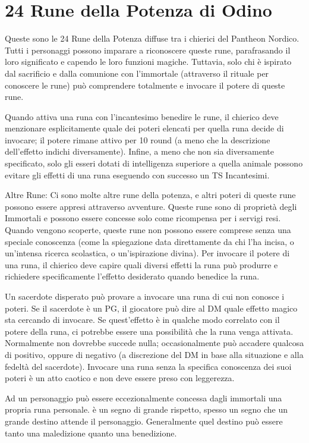 \documentclass[10pt,a4paper]{article}
\begin{document}
\section*{24 Rune della Potenza di Odino}
 
Queste sono le 24 Rune della Potenza diffuse tra i chierici del Pantheon Nordico. Tutti i personaggi possono imparare a riconoscere 
queste rune, parafrasando il loro significato e capendo le loro funzioni magiche. Tuttavia, solo chi \`{e} ispirato dal sacrificio e 
dalla comunione con l'immortale (attraverso il rituale per conoscere le rune) pu\`{o} comprendere totalmente e invocare il potere di queste 
rune.
 
Quando attiva una runa con l'incantesimo benedire le rune, il chierico deve menzionare esplicitamente quale dei poteri elencati per quella runa decide di invocare; il potere rimane attivo per 10 round (a meno che la descrizione dell'effetto indichi diversamente). Infine, a meno che non sia diversamente specificato, solo gli esseri dotati di intelligenza superiore a quella animale possono evitare gli effetti di una runa eseguendo con successo un TS Incantesimi.
 
Altre Rune: Ci sono molte altre rune della potenza, e altri poteri di queste rune possono essere appresi attraverso avventure. Queste 
rune sono di propriet\`{a} degli Immortali e possono essere concesse solo come ricompensa per i servigi resi. Quando vengono scoperte, 
queste rune non possono essere comprese senza una speciale conoscenza (come la spiegazione data direttamente da chi l'ha incisa, o 
un'intensa ricerca scolastica, o un'ispirazione divina). Per invocare il potere di una runa, il chierico deve capire quali diversi 
effetti la runa pu\`{o} produrre e richiedere specificamente l'effetto desiderato quando benedice la runa.
 
Un sacerdote disperato pu\`{o} provare a invocare una runa di cui non conosce i poteri. Se il sacerdote \`{e} un PG, il giocatore pu\`{o} dire al 
DM quale effetto magico sta cercando di invocare. Se quest'effetto \`{e} in qualche modo correlato con il potere della runa, ci potrebbe 
essere una possibilit\`{a} che la runa venga attivata. Normalmente non dovrebbe succede nulla; occasionalmente pu\`{o} accadere qualcosa di 
positivo, oppure di negativo (a discrezione del DM in base alla situazione e alla fedelt\`{a} del sacerdote). Invocare una runa senza la 
specifica conoscenza dei suoi poteri \`{e} un atto caotico e non deve essere preso con leggerezza.
 
Ad un personaggio pu\`{o} essere eccezionalmente concessa dagli immortali una propria runa personale. \`{e} un segno di grande rispetto, spesso 
un segno che un grande destino attende il personaggio. Generalmente quel destino pu\`{o} essere tanto una maledizione quanto una 
benedizione.
 
\end{document}
